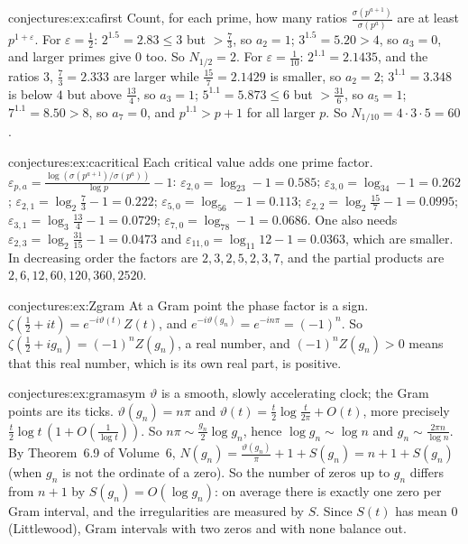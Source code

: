 \begin{solution}{conjectures:ex:cafirst}
\idea Count, for each prime, how many ratios $\frac{\sigma(p^{a+1})}{\sigma(p^a)}$ are at least $p^{1+\varepsilon}$.
\writeup For $\varepsilon=\frac12$: $2^{1.5}=2.83\le3$ but $>\frac73$, so $a_2=1$; $3^{1.5}=5.20>4$, so $a_3=0$, and larger primes give $0$ too. So $N_{1/2}=2$.
For $\varepsilon=\frac1{10}$: $2^{1.1}=2.1435$, and the ratios $3$, $\frac73=2.333$ are larger while $\frac{15}7=2.1429$ is smaller, so $a_2=2$; $3^{1.1}=3.348$ is below
$4$ but above $\frac{13}4$, so $a_3=1$; $5^{1.1}=5.873\le6$ but $>\frac{31}6$, so $a_5=1$; $7^{1.1}=8.50>8$, so $a_7=0$, and $p^{1.1}>p+1$ for all larger $p$. So
$N_{1/10}=4\cdot3\cdot5=60$.
\end{solution}

\begin{solution}{conjectures:ex:cacritical}
\idea Each critical value adds one prime factor.
\writeup $\varepsilon_{p,a}=\frac{\log(\sigma(p^{a+1})/\sigma(p^a))}{\log p}-1$: $\varepsilon_{2,0}=\log_23-1=0.585$; $\varepsilon_{3,0}=\log_34-1=0.262$; $\varepsilon_{2,1}=\log_2\frac73-1=0.222$;
$\varepsilon_{5,0}=\log_56-1=0.113$; $\varepsilon_{2,2}=\log_2\frac{15}7-1=0.0995$; $\varepsilon_{3,1}=\log_3\frac{13}4-1=0.0729$; $\varepsilon_{7,0}=\log_78-1=0.0686$. One also needs
$\varepsilon_{2,3}=\log_2\frac{31}{15}-1=0.0473$ and $\varepsilon_{11,0}=\log_{11}12-1=0.0363$, which are smaller. In decreasing order the factors are $2,3,2,5,2,3,7$, and the
partial products are $2,6,12,60,120,360,2520$.
\end{solution}

\begin{solution}{conjectures:ex:Zgram}
\idea At a Gram point the phase factor is a sign.
\writeup $\zeta(\frac12+it)=e^{-i\vartheta(t)}Z(t)$, and $e^{-i\vartheta(g_n)}=e^{-in\pi}=(-1)^n$. So $\zeta(\frac12+ig_n)=(-1)^nZ(g_n)$, a real number, and $(-1)^nZ(g_n)>0$ means
that this real number, which is its own real part, is positive.
\end{solution}

\begin{solution}{conjectures:ex:gramasym}
\idea $\vartheta$ is a smooth, slowly accelerating clock; the Gram points are its ticks.
\writeup $\vartheta(g_n)=n\pi$ and $\vartheta(t)=\frac t2\log\frac t{2\pi}+O(t)$, more precisely $\frac t2\log t\,(1+O(\frac1{\log t}))$. So $n\pi\sim\frac{g_n}2\log g_n$, hence
$\log g_n\sim\log n$ and $g_n\sim\frac{2\pi n}{\log n}$. By Theorem~6.9 of Volume~6, $N(g_n)=\frac{\vartheta(g_n)}\pi+1+S(g_n)=n+1+S(g_n)$ (when $g_n$ is not the ordinate of a
zero). So the number of zeros up to $g_n$ differs from $n+1$ by $S(g_n)=O(\log g_n)$: on average there is exactly one zero per Gram interval, and the
irregularities are measured by $S$. Since $S(t)$ has mean $0$ (Littlewood), Gram intervals with two zeros and with none balance out.
\end{solution}

